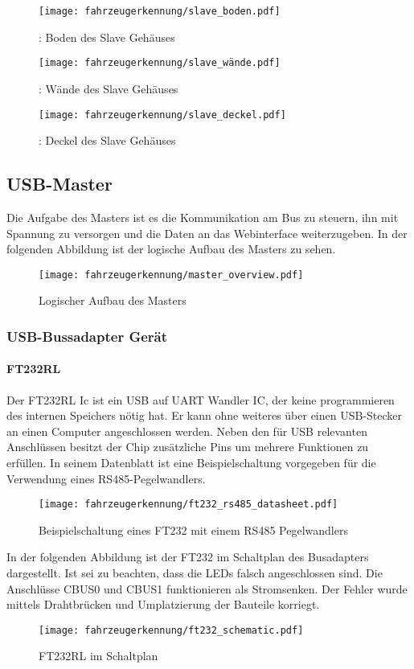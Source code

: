 \begin{figure}[!htb]
        \texttt{[image: fahrzeugerkennung/slave\_boden.pdf]}
        \caption{: Boden des Slave Gehäuses}
    \endminipage\hfill
        \texttt{[image: fahrzeugerkennung/slave\_wände.pdf]}
        \caption{: Wände des Slave Gehäuses}
    \endminipage\hfill
        \texttt{[image: fahrzeugerkennung/slave\_deckel.pdf]}
        \caption{: Deckel des Slave Gehäuses}
    \endminipage
\end{figure}

\subsection{USB-Master}
Die Aufgabe des Masters ist es die Kommunikation am Bus zu steuern, ihn mit Spannung zu versorgen und die Daten an das Webinterface weiterzugeben. 
In der folgenden Abbildung ist der logische Aufbau des Masters zu sehen.

\begin{figure}[H]
    \centering
    \texttt{[image: fahrzeugerkennung/master\_overview.pdf]}
    \caption{Logischer Aufbau des Masters}
\end{figure}
\subsubsection{USB-Bussadapter Gerät}
\paragraph{FT232RL}\mbox{} 

Der FT232RL Ic ist ein USB auf UART Wandler IC, der keine programmieren des internen Speichers nötig hat. Er kann ohne weiteres über einen USB-Stecker an einen Computer angeschlossen werden. 
Neben den für USB relevanten Anschlüssen besitzt der Chip zusätzliche Pins um mehrere Funktionen zu erfüllen. In seinem Datenblatt ist eine Beispielschaltung vorgegeben für die Verwendung eines RS485-Pegelwandlers.
\begin{figure}[H]
    \centering
    \texttt{[image: fahrzeugerkennung/ft232\_rs485\_datasheet.pdf]}
    \caption{Beispielschaltung eines FT232 mit einem RS485 Pegelwandlers}
\end{figure}

In der folgenden Abbildung ist der FT232 im Schaltplan des Busadapters dargestellt. Ist sei zu beachten, dass die LEDs falsch angeschlossen sind. Die Anschlüsse CBUS0 und CBUS1 funktionieren als Stromsenken. 
Der Fehler wurde mittels Drahtbrücken und Umplatzierung der Bauteile korriegt.
\begin{figure}[H]
    \centering
    \texttt{[image: fahrzeugerkennung/ft232\_schematic.pdf]}
    \caption{FT232RL im Schaltplan}
\end{figure}

